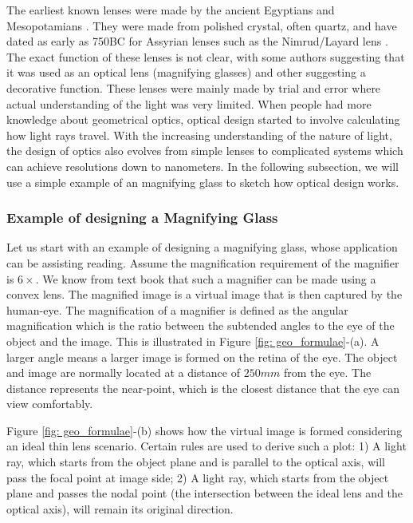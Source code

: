 The earliest known lenses were made by the ancient Egyptians and Mesopotamians \cite{wiki:HistoryofOptics}. They were made from polished crystal, often quartz, and have dated as early as 750BC for Assyrian lenses such as the Nimrud/Layard lens \cite{wiki:Nimrudlens}. The exact function of these lenses is not clear, with some authors suggesting that it was used as an optical lens (magnifying glasses) and other suggesting a decorative function. These lenses were mainly made by trial and error where actual understanding of the light was very limited. When people had more knowledge about geometrical optics, optical design started to involve calculating how light rays travel. With the increasing understanding of the nature of light, the design of optics also evolves from simple lenses to complicated systems which can achieve resolutions down to nanometers. In the following subsection, we will use a simple example of an magnifying glass to sketch how optical design works.     

\subsubsection{Example of designing a Magnifying Glass} \label{magnifier}
\vspace{1em}
Let us start with an example of designing a magnifying glass, whose application can be assisting reading. Assume the magnification requirement of the magnifier is $6\times$. We know from text book \cite{hecht2012optics} that such a magnifier can be made using a convex lens. The magnified image is a virtual image that is then captured by the human-eye. The magnification of a magnifier is defined as the angular magnification which is the ratio between the subtended angles to the eye of the object and the image. This is illustrated in Figure \ref{fig: geo_formulae}-(a). A larger angle means a larger image is formed on the retina of the eye. The object and image are normally located at a distance of $250 mm$ from the eye. The distance represents the near-point, which is the closest distance that the eye can view comfortably. 


Figure \ref{fig: geo_formulae}-(b) shows how the virtual image is formed considering an ideal thin lens scenario. Certain rules are used to derive such a plot:
1) A light ray, which starts from the object plane and is parallel to the optical axis, will pass the focal point at image side;
2) A light ray, which starts from the object plane and passes the nodal point (the intersection between the ideal lens and the optical axis), will remain its original direction.

